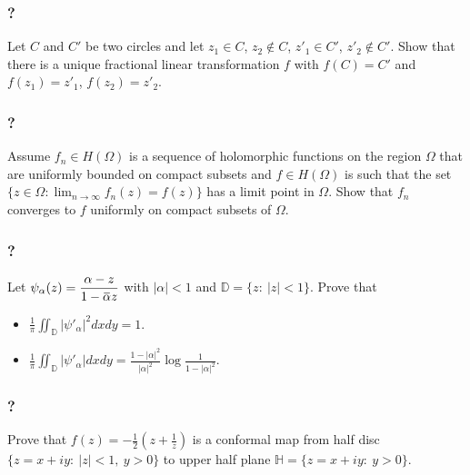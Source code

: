 \hypertarget{section-173}{%
\subsubsection{?}\label{section-173}}

Let \(C\) and \(C'\) be two circles and let \(z_1 \in C\),
\(z_2 \notin C\), \(z'_1 \in C'\), \(z'_2 \notin C'\). Show that there
is a unique fractional linear transformation \(f\) with \(f(C) = C'\)
and \(f(z_1) = z'_1\), \(f(z_2) = z'_2\).

\hypertarget{section-174}{%
\subsubsection{?}\label{section-174}}

Assume \(f_n \in H(\Omega)\) is a sequence of holomorphic functions on
the region \(\Omega\) that are uniformly bounded on compact subsets and
\(f \in H(\Omega)\) is such that the set
\(\displaystyle \{z \in \Omega: \lim_{n \rightarrow \infty} f_n(z) = f(z) \}\)
has a limit point in \(\Omega\). Show that \(f_n\) converges to \(f\)
uniformly on compact subsets of \(\Omega\).

\hypertarget{section-175}{%
\subsubsection{?}\label{section-175}}

Let
\(\displaystyle{\psi_{\alpha}(z)=\frac{\alpha-z}{1-\mkern 1.5mu\overline{\mkern-1.5mu\alpha\mkern-1.5mu}\mkern 1.5muz}}\)
with \(|\alpha|<1\) and \({\mathbb D}=\{z:\ |z|<1\}\). Prove that

\begin{itemize}
\item
  \(\displaystyle{\frac{1}{\pi}\iint_{{\mathbb D}} |\psi'_{\alpha}|^2 dx dy =1}\).
\item
  \(\displaystyle{\frac{1}{\pi}\iint_{{\mathbb D}} |\psi'_{\alpha}| dx dy =\frac{1-|\alpha|^2}{|\alpha|^2} \log \frac{1}{1-|\alpha|^2}}\).
\end{itemize}

\hypertarget{section-176}{%
\subsubsection{?}\label{section-176}}

Prove that
\(\displaystyle{f(z)=-\frac{1}{2}\left(z+\frac{1}{z}\right)}\) is a
conformal map from half disc \(\{z=x+iy:\ |z|<1,\ y>0\}\) to upper half
plane \({\mathbb H}=\{z=x+iy:\ y>0\}\).

